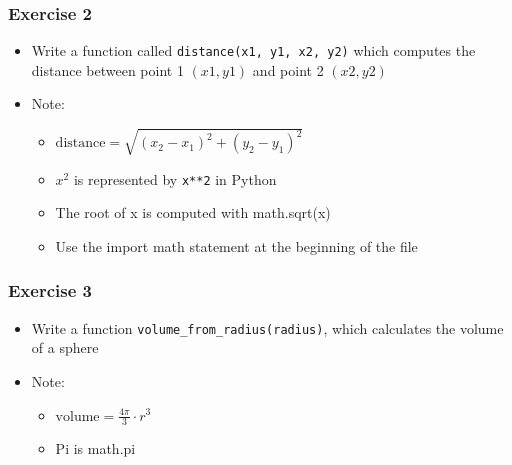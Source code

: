 \documentclass[10pt, a4paper]{beamer} %
\newcommand{\lb}[1]{{\color{mLightBrown}#1}}
\newcommand{\bblock}[3]{
        \begin{block}{#1}
        #2
    \end{block}
}
\begin{document}

{
\bfseries
\begin{frame}[c, fragile]\frametitle{Exercise 2}
    
\begin{itemize}
    \item Write a function called \texttt{distance(x1, y1, x2, y2)} which computes the distance between point 1 $(x1, y1)$ and point 2 $(x2, y2)$
    \item Note:
        \begin{itemize}
            \item \( \text{distance} = \sqrt{\left(x_2 - x_1\right)^2 + \left(y_2 - y_1\right)^2} \)
            \item $x^2$ is represented by \texttt{x**2} in Python
            \item The root of x is computed with math.sqrt(x)
            \item Use the import math statement at the beginning of the file
        \end{itemize}
\end{itemize}
\end{frame}

\begin{frame}[c, fragile]\frametitle{Exercise 3}
\begin{itemize}
    \item Write a function \texttt{volume\_from\_radius(radius)}, which calculates the
volume of a sphere
    \item Note:
    \begin{itemize}
        \item \( \text{volume} = \frac{4\pi}{3}\cdot r^3\)
        \item Pi is math.pi
    \end{itemize}
\end{itemize}
    

\end{frame}}
\end{document}
